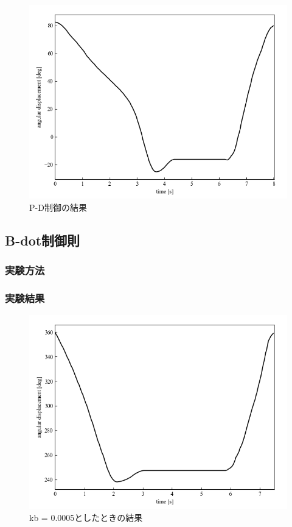 \begin{figure}[H]
	\centering
		\includegraphics[scale=0.5]{./figure/PD.png}
		\caption{P-D制御の結果}
		\label{fig:PD}
\end{figure}

\newpage

\subsection{B-dot制御則}
\subsubsection{実験方法}
\subsubsection{実験結果}

\begin{figure}[H]
	\centering
		\includegraphics[scale=0.5]{./figure/5kb.png}
		\caption{kb = 0.0005としたときの結果}
		\label{fig:kb5}
\end{figure}


